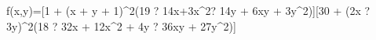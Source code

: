 f(x,y)=[1 + (x + y + 1)^2(19 ? 14x+3x^2? 14y + 6xy + 3y^2)][30 + (2x ? 3y)^2(18 ? 32x + 12x^2 + 4y ? 36xy + 27y^2)]
